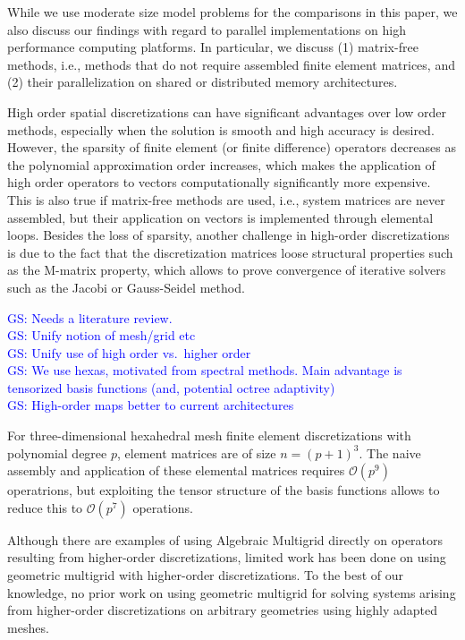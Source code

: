 \documentclass[smallcondensed,final]{svjour3}     %
\newcommand{\gsnote}[1]{\textcolor{blue}{GS: #1}}
\begin{document}
While we use moderate size model problems for the comparisons in this
paper, we also discuss our findings with regard to parallel
implementations on high performance computing platforms.  In
particular, we discuss (1) matrix-free methods, i.e., methods that do
not require assembled finite element matrices, and (2) their
parallelization on shared or distributed memory architectures.

High order spatial discretizations can have significant advantages
over low order methods, especially when the solution is smooth and
high accuracy is desired. However, the sparsity of finite element (or
finite difference) operators decreases as the polynomial approximation
order increases, which makes the application of high order operators
to vectors computationally significantly more expensive. This is also
true if matrix-free methods are used, i.e., system matrices are never
assembled, but their application on vectors is implemented through
elemental loops.  Besides the loss of sparsity, another challenge in
high-order discretizations is due to the fact that the discretization
matrices loose structural properties such as the M-matrix property,
which allows to prove convergence of iterative solvers such as the
Jacobi or Gauss-Seidel method.

\noindent
\gsnote{Needs a literature review.}\\
\gsnote{Unify notion of mesh/grid etc}\\
\gsnote{Unify use of high order vs.\ higher order}\\
\gsnote{We use hexas, motivated from spectral methods. Main
  advantage is tensorized basis functions (and, potential octree adaptivity)}\\
\gsnote{ High-order maps better to current architectures}


For three-dimensional hexahedral mesh finite element discretizations
with polynomial degree $p$, element matrices are of size
$n=(p+1)^3$. The naive assembly and application of these elemental
matrices requires $\mathcal O(p^9)$ operatrions, but exploiting the
tensor structure of the basis functions allows to reduce this to
$\mathcal O(p^7)$ operations.


Although there are examples of using Algebraic Multigrid directly on
operators resulting from higher-order discretizations, limited work
has been done on using geometric multigrid with higher-order
discretizations. To the best of our knowledge, no prior work on using
geometric multigrid for solving systems arising from higher-order
discretizations on arbitrary geometries using highly adapted meshes.
\end{document}
